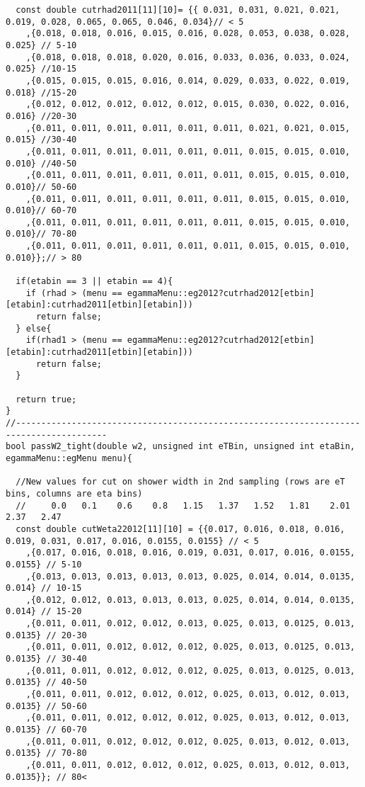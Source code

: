 \begin{lstlisting}
  const double cutrhad2011[11][10]= {{ 0.031, 0.031, 0.021, 0.021, 0.019, 0.028, 0.065, 0.065, 0.046, 0.034}// < 5
	,{0.018, 0.018, 0.016, 0.015, 0.016, 0.028, 0.053, 0.038, 0.028, 0.025} // 5-10 
	,{0.018, 0.018, 0.018, 0.020, 0.016, 0.033, 0.036, 0.033, 0.024, 0.025} //10-15
	,{0.015, 0.015, 0.015, 0.016, 0.014, 0.029, 0.033, 0.022, 0.019, 0.018} //15-20
	,{0.012, 0.012, 0.012, 0.012, 0.012, 0.015, 0.030, 0.022, 0.016, 0.016} //20-30
	,{0.011, 0.011, 0.011, 0.011, 0.011, 0.011, 0.021, 0.021, 0.015, 0.015} //30-40
	,{0.011, 0.011, 0.011, 0.011, 0.011, 0.011, 0.015, 0.015, 0.010, 0.010} //40-50
	,{0.011, 0.011, 0.011, 0.011, 0.011, 0.011, 0.015, 0.015, 0.010, 0.010}// 50-60 
	,{0.011, 0.011, 0.011, 0.011, 0.011, 0.011, 0.015, 0.015, 0.010, 0.010}// 60-70 
	,{0.011, 0.011, 0.011, 0.011, 0.011, 0.011, 0.015, 0.015, 0.010, 0.010}// 70-80 
	,{0.011, 0.011, 0.011, 0.011, 0.011, 0.011, 0.015, 0.015, 0.010, 0.010}};// > 80

  if(etabin == 3 || etabin == 4){
    if (rhad > (menu == egammaMenu::eg2012?cutrhad2012[etbin][etabin]:cutrhad2011[etbin][etabin]))
      return false;
  } else{
    if(rhad1 > (menu == egammaMenu::eg2012?cutrhad2012[etbin][etabin]:cutrhad2011[etbin][etabin]))
      return false;
  }

  return true;
}
//----------------------------------------------------------------------------------------
bool passW2_tight(double w2, unsigned int eTBin, unsigned int etaBin, egammaMenu::egMenu menu){
  
  //New values for cut on shower width in 2nd sampling (rows are eT bins, columns are eta bins)
  //     0.0   0.1    0.6    0.8   1.15   1.37   1.52   1.81    2.01   2.37   2.47
  const double cutWeta22012[11][10] = {{0.017, 0.016, 0.018, 0.016, 0.019, 0.031, 0.017, 0.016, 0.0155, 0.0155} // < 5 
	,{0.017, 0.016, 0.018, 0.016, 0.019, 0.031, 0.017, 0.016, 0.0155, 0.0155} // 5-10
	,{0.013, 0.013, 0.013, 0.013, 0.013, 0.025, 0.014, 0.014, 0.0135, 0.014} // 10-15 
	,{0.012, 0.012, 0.013, 0.013, 0.013, 0.025, 0.014, 0.014, 0.0135, 0.014} // 15-20 
	,{0.011, 0.011, 0.012, 0.012, 0.013, 0.025, 0.013, 0.0125, 0.013, 0.0135} // 20-30
	,{0.011, 0.011, 0.012, 0.012, 0.012, 0.025, 0.013, 0.0125, 0.013, 0.0135} // 30-40
	,{0.011, 0.011, 0.012, 0.012, 0.012, 0.025, 0.013, 0.0125, 0.013, 0.0135} // 40-50
	,{0.011, 0.011, 0.012, 0.012, 0.012, 0.025, 0.013, 0.012, 0.013, 0.0135} // 50-60
	,{0.011, 0.011, 0.012, 0.012, 0.012, 0.025, 0.013, 0.012, 0.013, 0.0135} // 60-70
	,{0.011, 0.011, 0.012, 0.012, 0.012, 0.025, 0.013, 0.012, 0.013, 0.0135} // 70-80
	,{0.011, 0.011, 0.012, 0.012, 0.012, 0.025, 0.013, 0.012, 0.013, 0.0135}}; // 80<  


\end{lstlisting}
